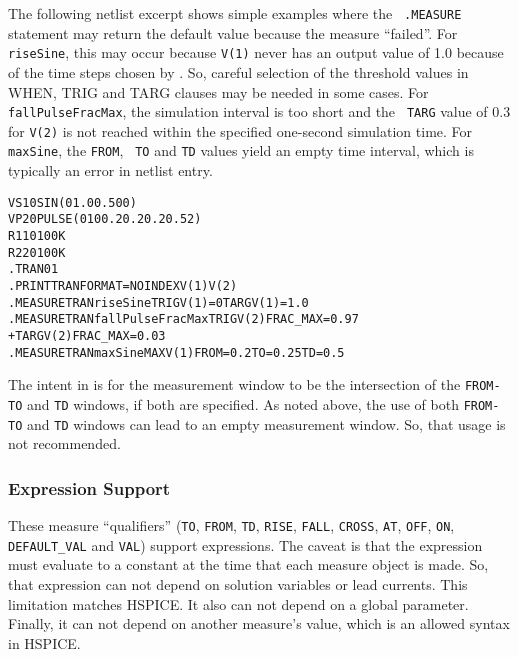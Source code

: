 The following netlist excerpt shows simple examples where the {\tt
.MEASURE} statement may return the default value because the measure
``failed''.  For {\tt riseSine}, this may occur because {\tt V(1)}
never has an output value of 1.0 because of the time steps chosen
by \Xyce{}. So, careful selection of the threshold values in WHEN,
TRIG and TARG clauses may be needed in some cases.  For {\tt
fallPulseFracMax}, the simulation interval is too short and the {\tt
TARG} value of 0.3 for {\tt V(2)} is not reached within the specified
one-second simulation time.  For {\tt maxSine}, the {\tt FROM}, {\tt
TO} and {\tt TD} values yield an empty time interval, which is
typically an error in netlist entry.
\begin{alltt}
VS  1  0  SIN(0 1.0 0.5 0 0)
VP  2  0  PULSE( 0 10 0.2 0.2 0.2 0.5 2)
R1  1  0  100K
R2  2  0  100K
.TRAN 0  1
.PRINT TRAN FORMAT=NOINDEX V(1) V(2)
.MEASURE TRAN riseSine TRIG V(1)=0 TARG V(1)=1.0
.MEASURE TRAN fallPulseFracMax TRIG V(2) FRAC_MAX=0.97
+ TARG V(2) FRAC_MAX=0.03
.MEASURE TRAN maxSine MAX V(1) FROM=0.2 TO=0.25 TD=0.5
\end{alltt}
The intent in \Xyce{} is for the measurement window to be the
intersection of the {\tt FROM-TO} and {\tt TD} windows, if both are
specified.  As noted above, the use of both {\tt FROM-TO} and {\tt TD}
windows can lead to an empty measurement window.  So, that usage is
not recommended.

\subsubsection{Expression Support}
These measure ``qualifiers'' (\texttt{TO}, \texttt{FROM}, \texttt{TD},
\texttt{RISE}, \texttt{FALL}, \texttt{CROSS}, \texttt{AT}, \texttt{OFF},
\texttt{ON}, \texttt{DEFAULT\_VAL} and \texttt{VAL}) support expressions.
The caveat is that the expression must evaluate to a constant at the time
that each measure object is made.  So, that expression can not depend
on solution variables or lead currents.  This limitation matches HSPICE.
It also can not depend on a global parameter.  Finally, it can not depend
on another measure's value, which is an allowed syntax in HSPICE.

